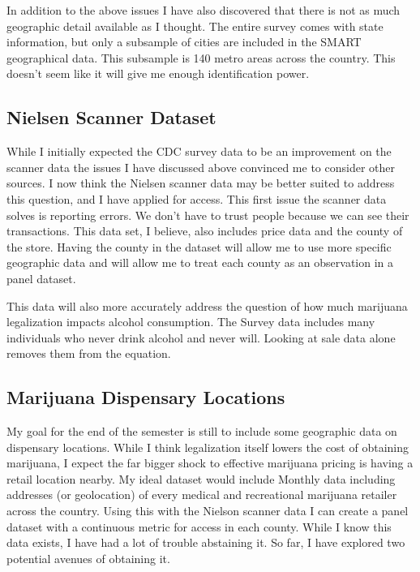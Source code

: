 \documentclass[11pt]{article}
\begin{document}
 In addition to the above issues I have also discovered that there is not as much geographic detail available as I thought. The entire survey comes with state information, but only a subsample of cities are included in the SMART geographical data. This subsample is 140 metro areas across the country. This doesn't seem like it will give me enough identification power.

\subsection{Nielsen Scanner Dataset}

While I initially expected the CDC survey data to be an improvement on the scanner data the issues I have discussed above convinced me to consider other sources.  I now think the Nielsen scanner data may be better suited to address this question, and I have applied for access. This first issue the scanner data solves is reporting errors. We don't have to trust people because we can see their transactions. This data set, I believe, also includes price data and the county of the store. Having the county in the dataset will allow me to use more specific geographic data and will allow me to treat each county as an observation in a panel dataset. \par

This data will also more accurately address the question of how much marijuana legalization impacts alcohol consumption. The Survey data includes many individuals who never drink alcohol and never will. Looking at sale data alone removes them from the equation.  \par 


\subsection{Marijuana Dispensary Locations}

My goal for the end of the semester is still to include some geographic data on dispensary locations. While I think legalization itself lowers the cost of obtaining marijuana, I expect the far bigger shock to effective marijuana pricing is having a retail location nearby. My ideal dataset would include Monthly data including addresses (or geolocation) of every medical and recreational marijuana retailer across the country. Using this with the Nielson scanner data I can create a panel dataset with a continuous metric for access in each county. While I know this data exists, I have had a lot of trouble abstaining it. So far, I have explored two potential avenues of obtaining it. \par
\end{document}
